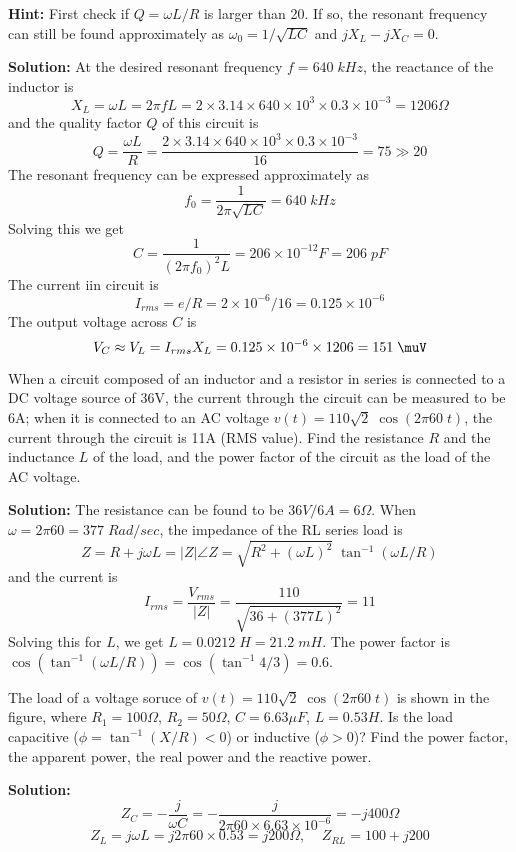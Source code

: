 {\bf Hint:} First check if $Q=\omega L/R$ is larger than 20. If so, the
resonant frequency can still be found approximately as 
$\omega_0=1/\sqrt{LC}$ and $jX_L-jX_C=0$.


{\bf Solution:} At the desired resonant frequency $f=640\;kHz$, the 
reactance of the inductor is
\[ X_L=\omega L=2\pi f L=2\times 3.14\times 640\times 10^3\times 0.3
	\times 10^{-3}=1206\Omega \]
and the quality factor $Q$ of this circuit is 
\[	Q=\frac{\omega L}{R}=\frac{2\times 3.14\times 640\times 
	10^3\times 0.3\times 10^{-3}}{16}=75 \gg 20	\]
The resonant frequency can be expressed approximately as
\[	f_0=\frac{1}{2\pi\sqrt{LC}}=640\;kHz	\]
Solving this we get
\[	C=\frac{1}{(2\pi f_0)^2L}=206\times 10^{-12}F=206\;pF	\]
The current iin circuit is
\[	I_{rms}=e/R=2\times 10^{-6}/16=0.125\times 10^{-6} \]
The output voltage across $C$ is
\[ V_C\approx V_L=I_{rms} X_L=0.125\times 10^{-6}\times 1206=151\;\muV \]


\item When a circuit composed of an inductor and a resistor in series
is connected to a DC voltage source of 36V, the current through the 
circuit can be measured to be 6A; when it is connected to an AC voltage 
$v(t)=110 \sqrt{2}\;\cos(2\pi 60\;t)$, the current through the circuit 
is 11A (RMS value). Find the resistance $R$ and the inductance $L$
of the load, and the power factor of the circuit as the load of the AC
voltage. 

{\bf Solution:} The resistance can be found to be $36V/6A=6\Omega$.
When $\omega=2\pi 60=377\;Rad/sec$, the impedance of the RL series load 
is 
\[ Z=R+j\omega L=|Z|\angle Z=\sqrt{R^2+( \omega L)^2}\;\tan^{-1} (\omega L/R) \]
and the current is
\[ I_{rms}=\frac{V_{rms}}{|Z|}=\frac{110}{\sqrt{36+(377 L)^2}}=11 \]
Solving this for $L$, we get $L=0.0212\;H=21.2\;mH$. The power factor is
$\cos (\tan^{-1} (\omega L/R))=\cos (\tan^{-1} 4/3)=0.6$.

\item The load of a voltage soruce of $v(t)=110\sqrt{2} \;\cos(2\pi 60\;t)$
is shown in the figure, where $R_1=100\Omega$, $R_2=50\Omega$, $C=6.63\mu F$, 
$L=0.53 H$. Is the load capacitive ($\phi=\tan^{-1}(X/R)<0$) or inductive 
($\phi>0$)? Find the power factor, the apparent power, the real power and 
the reactive power. 


 {\bf Solution:}
 \[ Z_C=-\frac{j}{\omega C}=-\frac{j}{2\pi 60\times 6.63\times 10^{-6}}
 	=-j400\Omega\]
 \[Z_L=j\omega L=j 2\pi 60\times 0.53=j200\Omega,\;\;\;\; Z_{RL}=100+j200\]
 
